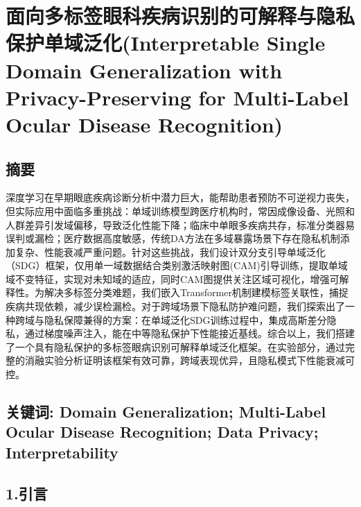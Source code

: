 \section{\texorpdfstring{ 面向多标签眼科疾病识别的可解释与隐私保护单域泛化(Interpretable Single Domain Generalization with Privacy-Preserving for Multi-Label Ocular Disease Recognition)}{ 面向多标签眼科疾病识别的可解释与隐私保护单域泛化(Interpretable Single Domain Generalization with Privacy-Preserving for Multi-Label Ocular Disease Recognition)}}\label{ux9762ux5411ux591aux6807ux7b7eux773cux79d1ux75beux75c5ux8bc6ux522bux7684ux53efux89e3ux91caux4e0eux9690ux79c1ux4fddux62a4ux5355ux57dfux6cdbux5316interpretable-single-domain-generalization-with-privacy-preserving-for-multi-label-ocular-disease-recognition}

\subsection{摘要}\label{ux6458ux8981}

深度学习在早期眼底疾病诊断分析中潜力巨大，能帮助患者预防不可逆视力丧失，但实际应用中面临多重挑战：单域训练模型跨医疗机构时，常因成像设备、光照和人群差异引发域偏移，导致泛化性能下降；临床中单眼多疾病共存，标准分类器易误判或漏检；医疗数据高度敏感，传统DA方法在多域暴露场景下存在隐私机制添加复杂、性能衰减严重问题。针对这些挑战，我们设计双分支引导单域泛化（SDG）框架，仅用单一域数据结合类别激活映射图(CAM)引导训练，提取单域域不变特征，实现对未知域的适应，同时CAM图提供关注区域可视化，增强可解释性。为解决多标签分类难题，我们嵌入Transformer机制建模标签关联性，捕捉疾病共现依赖，减少误检漏检。对于跨域场景下隐私防护难问题，我们探索出了一种跨域与隐私保障兼得的方案：在单域泛化SDG训练过程中，集成高斯差分隐私，通过梯度噪声注入，能在中等隐私保护下性能接近基线。综合以上，我们搭建了一个具有隐私保护的多标签眼病识别可解释单域泛化框架。在实验部分，通过完整的消融实验分析证明该框架有效可靠，跨域表现优异，且隐私模式下性能衰减可控。

\subsection{关键词: Domain Generalization; Multi-Label Ocular Disease Recognition; Data Privacy; Interpretability}\label{ux5173ux952eux8bcd-domain-generalization-multi-label-ocular-disease-recognition-data-privacy-interpretability}

\subsection{1.引言}\label{ux5f15ux8a00}


